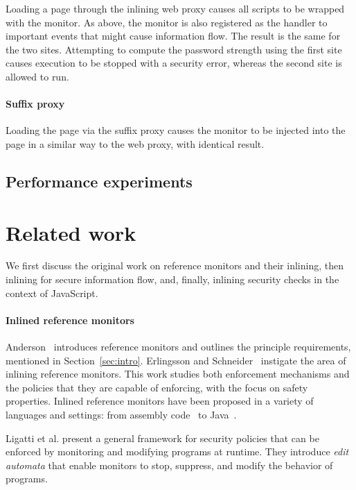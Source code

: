 \documentclass{llncs}
\begin{document}
Loading a page through the inlining web proxy causes all scripts to be wrapped
with the monitor. As above, the monitor is also registered as the handler to
important events that might cause information flow. The result is the same
for the two sites. Attempting to compute the password strength using the first
site causes execution to be stopped with a security error, whereas the second
site is allowed to run.

\paragraph{Suffix proxy}

Loading the page via the suffix proxy causes the monitor to be injected into the page in 
a similar way to the web proxy, with identical result.

\subsection{Performance experiments}

\section{Related work}
\label{sec:related}
We first discuss the original work on reference monitors and their
inlining, then
inlining for secure information flow, 
and, finally,
inlining security checks in the context of
JavaScript.

\paragraph{Inlined reference monitors}
Anderson~\cite{Anderson:72} introduces reference monitors and
outlines the principle requirements, mentioned in Section~\ref{sec:intro}.
%
Erlingsson and Schneider~\cite{DBLP:conf/nspw/ErlingssonS99,Erlingsson:PhD04} instigate
the area of inlining reference monitors. 
This work studies both enforcement mechanisms and the policies
that they are capable of enforcing, with the focus on safety properties.
Inlined reference monitors
have been proposed in a variety of languages and settings: from
assembly code~\cite{DBLP:conf/nspw/ErlingssonS99} to Java~\cite{DBLP:conf/ecoop/DamJLP09,DBLP:journals/jcs/DamJLP10,DBLP:conf/ccs/DamGL12}.

Ligatti et al. \cite{Ligatti05editautomata:} present a 
general framework for security policies that can
be enforced by monitoring and modifying programs at runtime. 
They introduce \emph{edit automata} that enable
monitors to stop, suppress, and modify the behavior of programs. 
\end{document}
